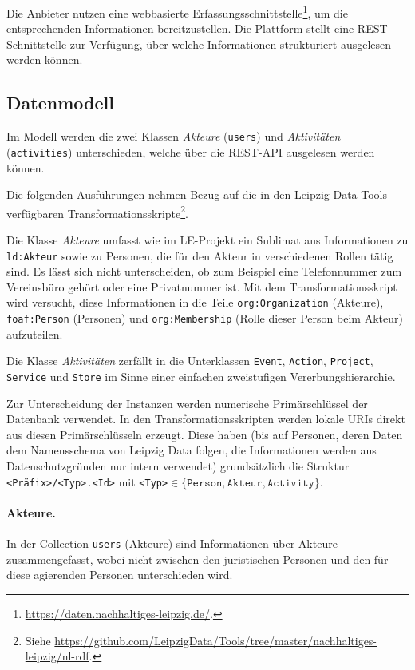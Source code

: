 \documentclass[a4paper,11pt]{article}
\begin{document}
Die Anbieter nutzen eine webbasierte
Erfassungsschnittstelle\footnote{\url{https://daten.nachhaltiges-leipzig.de/}.},
um die entsprechenden Informationen bereitzustellen.  Die Plattform stellt
eine REST-Schnittstelle zur Verfügung, über welche Informationen strukturiert
ausgelesen werden können.

\subsection{Datenmodell}

Im Modell werden die zwei Klassen \emph{Akteure} (\texttt{users}) und
\emph{Aktivitäten} (\texttt{activities}) unterschieden, welche über die
REST-API ausgelesen werden können.

Die folgenden Ausführungen nehmen Bezug auf die in den Leipzig
Data Tools verfügbaren Transformationsskripte\footnote{Siehe
  \url{https://github.com/LeipzigData/Tools/tree/master/nachhaltiges-leipzig/nl-rdf}.}.

Die Klasse \emph{Akteure} umfasst wie im LE-Projekt ein Sublimat aus
Informationen zu \texttt{ld:Akteur} sowie zu Personen, die für den Akteur in
verschiedenen Rollen tätig sind.  Es lässt sich nicht unterscheiden, ob zum
Beispiel eine Telefonnummer zum Vereinsbüro gehört oder eine Privatnummer ist.
Mit dem Transformationsskript wird versucht, diese Informationen in die Teile
\texttt{org:Organization} (Akteure), \texttt{foaf:Person} (Personen) und
\texttt{org:Membership} (Rolle dieser Person beim Akteur) aufzuteilen. 

Die Klasse \emph{Aktivitäten} zerfällt in die Unterklassen \texttt{Event},
\texttt{Action}, \texttt{Project}, \texttt{Service} und \texttt{Store} im
Sinne einer einfachen zweistufigen Vererbungshierarchie.

Zur Unterscheidung der Instanzen werden numerische Primärschlüssel der
Datenbank verwendet. In den Transformationsskripten werden lokale URIs direkt
aus diesen Primärschlüsseln erzeugt. Diese haben (bis auf Personen, deren
Daten dem Namensschema von Leipzig Data folgen, die Informationen werden aus
Datenschutzgründen nur intern verwendet) grundsätzlich die Struktur
\texttt{<Präfix>/<Typ>.<Id>} mit \texttt{<Typ>}$\in \{\texttt{Person},
\texttt{Akteur}, \texttt{Activity}\}$.

\paragraph{Akteure.}
In der Collection \texttt{users} (Akteure) sind Informationen über Akteure
zusammengefasst, wobei nicht zwischen den juristischen Personen und den für
diese agierenden Personen unterschieden wird. 
\end{document}

